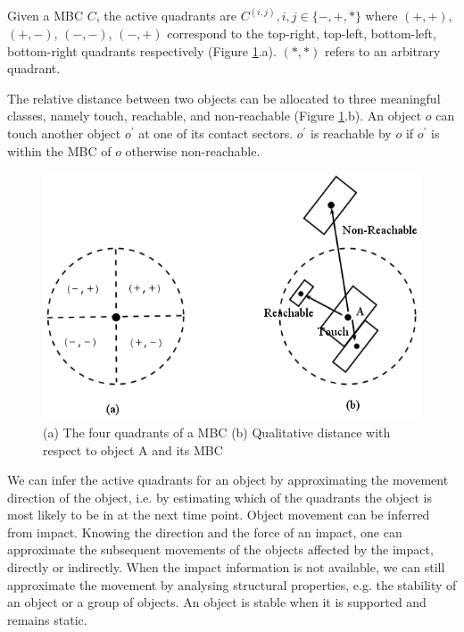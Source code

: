 \documentclass[letterpaper]{article}
\begin{document}
 Given a MBC $C$, the active quadrants are $C^{(i,j)}, i,j \in \{-, +, *\}$ where $(+,+)$, $(+,-)$, $(-,-)$, $(-,+)$ correspond to the top-right, top-left, bottom-left, bottom-right quadrants respectively (Figure \ref{Quadrants}.a). $(*, *)$ refers to an arbitrary quadrant. 

The relative distance between two objects can be allocated to three meaningful classes, namely touch, reachable, and non-reachable (Figure \ref{Quadrants}.b). An object $o$ can touch another object $o^\prime$ at one of its contact sectors. $o^\prime$ is reachable by $o$ if $o^\prime$ is within the MBC of $o$ otherwise non-reachable.

\begin{figure}[h!]
\centering\includegraphics[scale=0.3]{quadrants.png}\caption{(a) The four quadrants of a MBC (b) Qualitative distance with respect to object A and its MBC}
\label{Quadrants}
\end{figure}

We can infer the active quadrants for an object by approximating the movement direction of the object, i.e. by estimating which of the quadrants the object is most likely to be in at the next time point. Object movement can be inferred from impact. Knowing the direction and the force of an impact, one can approximate the subsequent movements of the objects affected by the impact, directly or indirectly. When the impact information is not available, we can still approximate the movement by analysing structural properties, e.g. the stability of an object or a group of objects. An object is stable when it is supported and remains static. %
\end{document}
